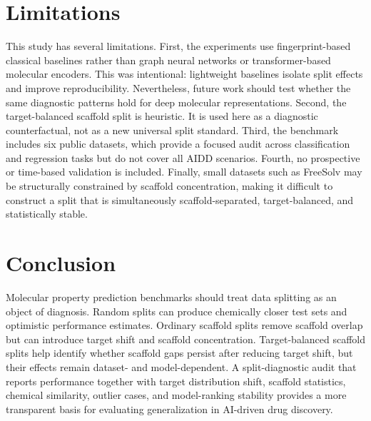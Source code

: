 \section{Limitations}

This study has several limitations. First, the experiments use fingerprint-based classical baselines rather than graph neural networks or transformer-based molecular encoders. This was intentional: lightweight baselines isolate split effects and improve reproducibility. Nevertheless, future work should test whether the same diagnostic patterns hold for deep molecular representations. Second, the target-balanced scaffold split is heuristic. It is used here as a diagnostic counterfactual, not as a new universal split standard. Third, the benchmark includes six public datasets, which provide a focused audit across classification and regression tasks but do not cover all AIDD scenarios. Fourth, no prospective or time-based validation is included. Finally, small datasets such as FreeSolv may be structurally constrained by scaffold concentration, making it difficult to construct a split that is simultaneously scaffold-separated, target-balanced, and statistically stable.

\section{Conclusion}

Molecular property prediction benchmarks should treat data splitting as an object of diagnosis. Random splits can produce chemically closer test sets and optimistic performance estimates. Ordinary scaffold splits remove scaffold overlap but can introduce target shift and scaffold concentration. Target-balanced scaffold splits help identify whether scaffold gaps persist after reducing target shift, but their effects remain dataset- and model-dependent. A split-diagnostic audit that reports performance together with target distribution shift, scaffold statistics, chemical similarity, outlier cases, and model-ranking stability provides a more transparent basis for evaluating generalization in AI-driven drug discovery.
